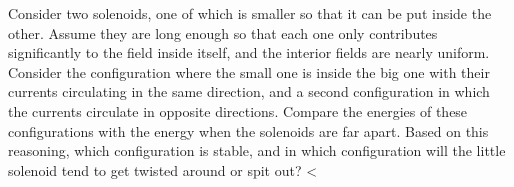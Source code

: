         Consider two solenoids, one of which is smaller so that
        it can be put inside the other. Assume they are long enough
        so that each one only contributes significantly to the field
        inside itself, and the interior fields are nearly uniform.
        Consider the configuration where the small one is inside the
        big one with their currents circulating in the same
        direction, and a second configuration in which the currents
        circulate in opposite directions. Compare the energies of
        these configurations with the energy when the solenoids are
        far apart. Based on this reasoning, which configuration is
        stable, and in which configuration will the little solenoid
        tend to get twisted around or spit out?
        <%
